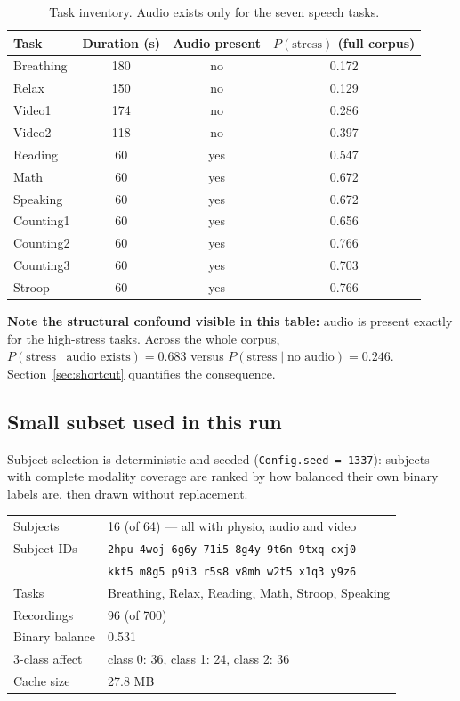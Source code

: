 \documentclass[11pt,a4paper]{article}
\newcommand{\code}[1]{\texttt{\small #1}}
\newcommand{\alert}[1]{\textcolor{alertred}{\textbf{#1}}}
\begin{document}
\begin{table}[h]\centering\small
\caption{Task inventory. Audio exists only for the seven speech tasks.}
\begin{tabular}{lccc}
\toprule
Task & Duration (s) & Audio present & $P(\text{stress})$ (full corpus) \\
\midrule
Breathing  & 180 & no  & 0.172 \\
Relax      & 150 & no  & 0.129 \\
Video1     & 174 & no  & 0.286 \\
Video2     & 118 & no  & 0.397 \\
Reading    & 60  & yes & 0.547 \\
Math       & 60  & yes & 0.672 \\
Speaking   & 60  & yes & 0.672 \\
Counting1  & 60  & yes & 0.656 \\
Counting2  & 60  & yes & 0.766 \\
Counting3  & 60  & yes & 0.703 \\
Stroop     & 60  & yes & 0.766 \\
\bottomrule
\end{tabular}
\end{table}

\noindent
\alert{Note the structural confound visible in this table:} audio is present exactly for
the high-stress tasks. Across the whole corpus,
$P(\text{stress}\mid\text{audio exists}) = 0.683$ versus
$P(\text{stress}\mid\text{no audio}) = 0.246$. Section~\ref{sec:shortcut} quantifies the
consequence.

\subsection{Small subset used in this run}

Subject selection is deterministic and seeded (\code{Config.seed = 1337}): subjects with
complete modality coverage are ranked by how balanced their own binary labels are, then
drawn without replacement.

\begin{center}\small
\begin{tabular}{ll}
\toprule
Subjects & 16 (of 64) --- all with physio, audio and video \\
Subject IDs & \code{2hpu 4woj 6g6y 71i5 8g4y 9t6n 9txq cxj0} \\
            & \code{kkf5 m8g5 p9i3 r5s8 v8mh w2t5 x1q3 y9z6} \\
Tasks & Breathing, Relax, Reading, Math, Stroop, Speaking \\
Recordings & 96 (of 700) \\
Binary balance & 0.531 \\
3-class affect & class 0: 36, class 1: 24, class 2: 36 \\
Cache size & 27.8 MB \\
\bottomrule
\end{tabular}
\end{center}
\end{document}
